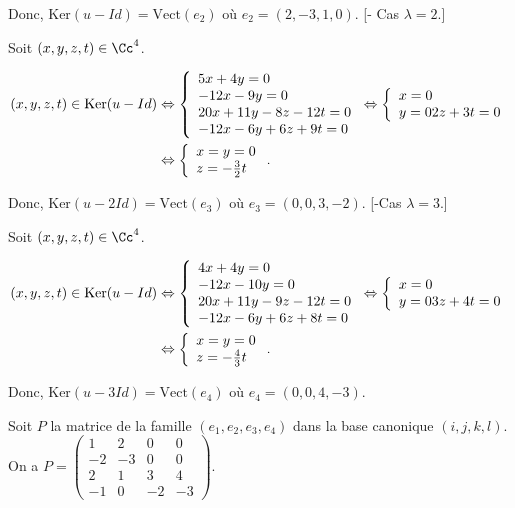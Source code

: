 {\begin{enumerate}
{\begin{itemize}
Donc, $\mbox{Ker}(u-Id)=\mbox{Vect}(e_2)$ où $e_2=(2,-3,1,0)$.
[- Cas $\lambda=2$.]

Soit $(x,y,z,t)\in\Cc^4$.

\begin{align*}\ensuremath
(x,y,z,t)\in\mbox{Ker}(u-Id)&\Leftrightarrow\left\{
\begin{array}{l}
5x+4y=0\\
-12x-9y=0\\
20x+11y-8z-12t=0\\
-12x-6y+6z+9t=0
\end{array}
\right.\Leftrightarrow\left\{
\begin{array}{l}
x=0\\
y=0
2z+3t=0
\end{array}
\right.
\\
 &\Leftrightarrow\left\{
\begin{array}{l}
x=y=0\\
z=-\frac{3}{2}t
\end{array}
\right.
.
\end{align*}

Donc, $\mbox{Ker}(u-2Id)=\mbox{Vect}(e_3)$ où $e_3=(0,0,3,-2)$.
[-Cas $\lambda=3$.]

Soit $(x,y,z,t)\in\Cc^4$.

\begin{align*}\ensuremath
(x,y,z,t)\in\mbox{Ker}(u-Id)&\Leftrightarrow\left\{
\begin{array}{l}
4x+4y=0\\
-12x-10y=0\\
20x+11y-9z-12t=0\\
-12x-6y+6z+8t=0
\end{array}
\right.\Leftrightarrow\left\{
\begin{array}{l}
x=0\\
y=0
3z+4t=0
\end{array}
\right.
\\
 &\Leftrightarrow\left\{
\begin{array}{l}
x=y=0\\
z=-\frac{4}{3}t
\end{array}
\right.
.
\end{align*}

Donc, $\mbox{Ker}(u-3Id)=\mbox{Vect}(e_4)$ où $e_4=(0,0,4,-3)$.

\end{itemize}

Soit $P$ la matrice de la famille $(e_1,e_2,e_3,e_4)$ dans la base canonique $(i,j,k,l)$. On a $P=\left(
\begin{array}{cccc}
1&2&0&0\\
-2&-3&0&0\\
2&1&3&4\\
-1&0&-2&-3
\end{array}
\right)$.

}
\end{enumerate}}
